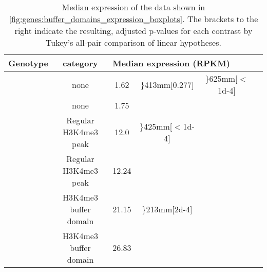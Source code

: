 \begin{table}[h!]
	\centering
	\setlength\extrarowheight{2pt}
		\begin{tabular}{lccccc}
			\textbf{Genotype} & \textbf{\hisfourthree category} & \multicolumn{3}{l}{\textbf{Median expression (RPKM)}} &\\
			\hline
			\dnmtwt & none & \num{1.62} & \rdelim\}{4}{13mm}[\parbox{13mm}{0.277}] & \rdelim\}{6}{25mm}[\parbox{25mm}{$<$\num{1d-4}}] & \\
			\dnmtchip & none & \num{1.75} & & \\
			\dnmtwt & Regular H3K4me3 peak & \num{ 12.0} & \rdelim\}{4}{25mm}[\parbox{25mm}{$<$\num{1d-4}}] \\
			\dnmtchip & Regular H3K4me3 peak & \num{12.24} \\
			\dnmtwt & H3K4me3 buffer domain & \num{21.15} & \rdelim\}{2}{13mm}[\parbox{13mm}{\num{2d-4}}] \\
			\dnmtchip & H3K4me3 buffer domain & \num{26.83} \\
			\hline
		\end{tabular}
	\caption{Median expression of the data shown in \autoref{fig:genes:buffer_domains_expression_boxplots}. The brackets to the right indicate the resulting, adjusted p-values for each contrast by Tukey's all-pair comparison of linear hypotheses.}
	\label{tab:genes:bufferdomain_expression}
\end{table}

